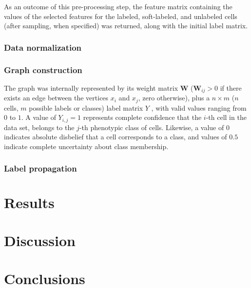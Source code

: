 \documentclass[oneside, a4paper, draft]{memoir} %
\begin{document}
As an outcome of this pre-processing step, the feature matrix containing the values of the selected features
for the labeled, soft-labeled, and unlabeled cells (after sampling, when specified) was returned, along with
the initial label matrix.

\subsubsection{Data normalization}
\lipsum[75]

\subsubsection{Graph construction}
The graph was internally represented by its weight matrix $\mathbf{W}$ ($\mathbf{W}_{ij}>0$ if there exists
an edge between the vertices $x_i$ and $x_j$, zero otherwise), plus a $n \times m$
($n$ cells, $m$ possible labels or classes) label matrix $Y$ , with valid values ranging from $0$ to $1$. A value
of $Y_{i,j}=1$ represents complete confidence that the $i$-th cell in the data set, belongs to the $j$-th
phenotypic class of cells. Likewise, a value of $0$ indicates absolute disbelief that a cell corresponds to a
class, and values of $0.5$ indicate complete uncertainty about class membership.

\subsubsection{Label propagation}
\textcolor{gray}{\lipsum[44]}

\section{Results}
\textcolor{gray}{\lipsum[8]}

\section{Discussion}
\textcolor{gray}{\lipsum[9]}

\section{Conclusions}
\textcolor{gray}{\lipsum[3]}

\end{document}
